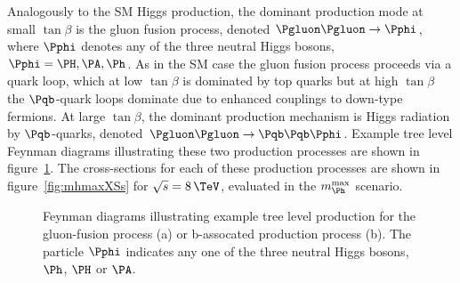 Analogously to the \ac{SM} Higgs production, the dominant production mode at
small $\tan\beta$ is the gluon fusion process, denoted
$\Pgluon\Pgluon\to\Pphi$, where $\Pphi$ denotes any of the three neutral Higgs
bosons, $\Pphi=\PH,\PA,\Ph$. As in the \ac{SM} case the gluon fusion process
proceeds via a quark loop, which at low $\tan\beta$ is dominated by top quarks
but at high $\tan\beta$ the $\Pqb$-quark loops dominate due to enhanced couplings to
down-type fermions. At large $\tan\beta$, the dominant production mechanism is
Higgs radiation by $\Pqb$-quarks, denoted $\Pgluon\Pgluon\to\Pqb\Pqb\Pphi$.
Example tree level Feynman diagrams illustrating these two production processes
are shown in figure~\ref{fig:mssmfeynman}. The cross-sections for each of these 
production processes are shown in
figure~\ref{fig:mhmaxXSs} for $\sqrt{s}=8\,\TeV$, evaluated in the $m_{\Ph}^{\text{max}}$
scenario.

\begin{figure}[htbp]
\caption[Feynman diagrams illustrating example tree level production of neutral
Higgs bosons in the MSSM.]{Feynman diagrams illustrating example tree level production for the
gluon-fusion process (a) or b-assocated production process (b). The
particle $\Pphi$ indicates any one of the three neutral Higgs bosons, $\Ph$,
$\PH$ or $\PA$.}
\label{fig:mssmfeynman}
\end{figure}

